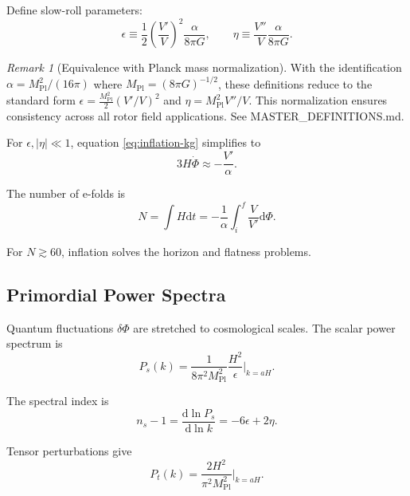 \documentclass[11pt,a4paper]{article}
\numberwithin{equation}{section}
\theoremstyle{plain}
\theoremstyle{definition}
\theoremstyle{remark}
\newtheorem{remark}[theorem]{Remark}
\newcommand{\dd}{\mathrm{d}}
\begin{document}
Define slow-roll parameters:
\begin{equation}
\epsilon \equiv \frac{1}{2}\left(\frac{V'}{V}\right)^2\frac{\alpha}{8\pi G}, \qquad \eta \equiv \frac{V''}{V}\frac{\alpha}{8\pi G}.
\label{eq:slow-roll-params}
\end{equation}

\begin{remark}[Equivalence with Planck mass normalization]
With the identification $\alpha = M_{\mathrm{Pl}}^2/(16\pi)$ where $M_{\mathrm{Pl}} = (8\pi G)^{-1/2}$, these definitions reduce to the standard form $\epsilon = \frac{M_{\mathrm{Pl}}^2}{2}(V'/V)^2$ and $\eta = M_{\mathrm{Pl}}^2 V''/V$. This normalization ensures consistency across all rotor field applications. See MASTER\_DEFINITIONS.md.
\end{remark}

For $\epsilon, |\eta| \ll 1$, equation \eqref{eq:inflation-kg} simplifies to
\begin{equation}
3H\dot{\Phi} \approx -\frac{V'}{\alpha}.
\end{equation}

The number of e-folds is
\begin{equation}
N = \int H\dd t = -\frac{1}{\alpha}\int_{i}^{f} \frac{V}{V'}\dd\Phi.
\label{eq:efolds}
\end{equation}

For $N \gtrsim 60$, inflation solves the horizon and flatness problems.

\subsection{Primordial Power Spectra}

Quantum fluctuations $\delta\Phi$ are stretched to cosmological scales. The scalar power spectrum is
\begin{equation}
P_s(k) = \frac{1}{8\pi^2 M_{\mathrm{Pl}}^2}\frac{H^2}{\epsilon}\bigg|_{k=aH}.
\label{eq:scalar-spectrum}
\end{equation}

The spectral index is
\begin{equation}
n_s - 1 = \frac{\dd\ln P_s}{\dd\ln k} = -6\epsilon + 2\eta.
\label{eq:spectral-index}
\end{equation}

Tensor perturbations give
\begin{equation}
P_t(k) = \frac{2H^2}{\pi^2 M_{\mathrm{Pl}}^2}\bigg|_{k=aH}.
\end{equation}
\end{document}
